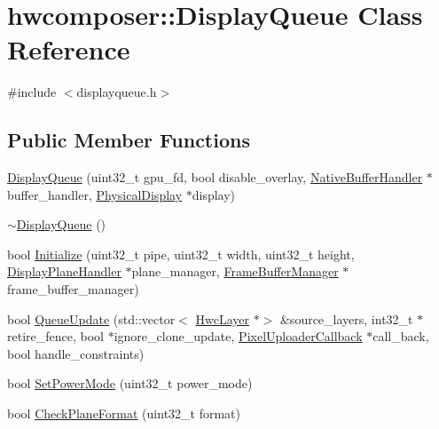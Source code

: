 \hypertarget{classhwcomposer_1_1DisplayQueue}{}\section{hwcomposer\+:\+:Display\+Queue Class Reference}
\label{classhwcomposer_1_1DisplayQueue}


{\ttfamily \#include $<$displayqueue.\+h$>$}

\subsection*{Public Member Functions}
\begin{DoxyCompactItemize}
\item 
\mbox{\hyperlink{classhwcomposer_1_1DisplayQueue_ac02bc414cc8093869e1de9cb5cddb869}{Display\+Queue}} (uint32\+\_\+t gpu\+\_\+fd, bool disable\+\_\+overlay, \mbox{\hyperlink{classhwcomposer_1_1NativeBufferHandler}{Native\+Buffer\+Handler}} $\ast$buffer\+\_\+handler, \mbox{\hyperlink{classhwcomposer_1_1PhysicalDisplay}{Physical\+Display}} $\ast$display)
\item 
\mbox{\hyperlink{classhwcomposer_1_1DisplayQueue_ac9eb3ffff04441f086f0a17c795ce5c1}{$\sim$\+Display\+Queue}} ()
\item 
bool \mbox{\hyperlink{classhwcomposer_1_1DisplayQueue_a88b95def4d501f85e2a83bef8b1c832d}{Initialize}} (uint32\+\_\+t pipe, uint32\+\_\+t width, uint32\+\_\+t height, \mbox{\hyperlink{classhwcomposer_1_1DisplayPlaneHandler}{Display\+Plane\+Handler}} $\ast$plane\+\_\+manager, \mbox{\hyperlink{classhwcomposer_1_1FrameBufferManager}{Frame\+Buffer\+Manager}} $\ast$frame\+\_\+buffer\+\_\+manager)
\item 
bool \mbox{\hyperlink{classhwcomposer_1_1DisplayQueue_ae3e70e00eba870771703c41b0753216a}{Queue\+Update}} (std\+::vector$<$ \mbox{\hyperlink{structhwcomposer_1_1HwcLayer}{Hwc\+Layer}} $\ast$$>$ \&source\+\_\+layers, int32\+\_\+t $\ast$retire\+\_\+fence, bool $\ast$ignore\+\_\+clone\+\_\+update, \mbox{\hyperlink{classhwcomposer_1_1PixelUploaderCallback}{Pixel\+Uploader\+Callback}} $\ast$call\+\_\+back, bool handle\+\_\+constraints)
\item 
bool \mbox{\hyperlink{classhwcomposer_1_1DisplayQueue_aa8ae9ab4014c0950196f2687ddc6fbb0}{Set\+Power\+Mode}} (uint32\+\_\+t power\+\_\+mode)
\item 
bool \mbox{\hyperlink{classhwcomposer_1_1DisplayQueue_a3b69d049bda17e67403bc782159a6aae}{Check\+Plane\+Format}} (uint32\+\_\+t format)
$$
\end{DoxyCompactItemize}
